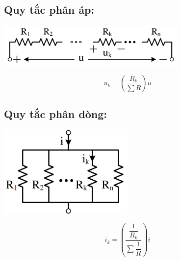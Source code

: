 \subsection{Quy tắc phân áp:}
\begin{center}
  \includegraphics[width = 0.7\textwidth]{./image/27.png}
\end{center}
\begin{equation}
  u_k = \left( \frac{R_k}{\sum R} \right)u
\end{equation}
\subsection{Quy tắc phân dòng:}
\begin{center}
  \includegraphics[width = 0.5\textwidth]{./image/28.png}
\end{center}
\begin{equation}
  i_k = \left( \frac{\dfrac{1}{R_k}}{\sum \dfrac{1}{R}} \right)i
\end{equation}